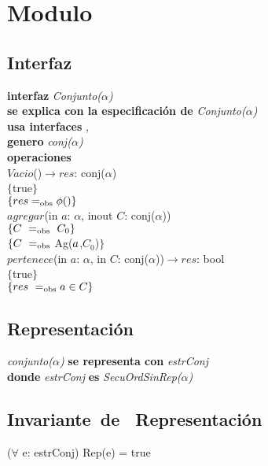 \section*{Modulo }

\subsection*{Interfaz}
\textbf{interfaz} \textit{Conjunto($\alpha$)}\\
\textbf{se explica con la especificaci\'on de} \textit{Conjunto($\alpha$)}\\
\textbf{usa interfaces} , \\
\textbf{genero} \textit{conj($\alpha$)}\\

\textbf{operaciones}\\
$Vacio$()$\longrightarrow res$: conj($\alpha$)\\
$\{$true$\}$\\
$\{{res} =_{\mathrm{obs}} \phi()\}$\\

$agregar$(in $a$: $\alpha$, inout $C$: conj($\alpha$))\\
$\{\sombreritoWide{C}\ \igobs\ C_0\}$\\
$\{{C}\ =_{\mathrm{obs}}$ Ag(${a}$,$C_0$)$\}$\\

$pertenece$(in $a$: $\alpha$, in $C$: conj($\alpha$))$\longrightarrow res$: bool\\
$\{$true$\}$\\
$\{{res}\ =_{\mathrm{obs}} {a}\in {C}\}$\\

\subsection*{Representaci\'on}
\textit{conjunto($\alpha$)} \textbf{se representa con} \textit{estrConj}\\
\textbf{donde} \textit{estrConj} \textbf{es} \textit{SecuOrdSinRep($\alpha$)}\\

\subsection*{Invariante\ de \ Representaci\'on}
\vspace{11pt}
($\forall$ e: estrConj) Rep(e) = true
\vspace{33pt}


